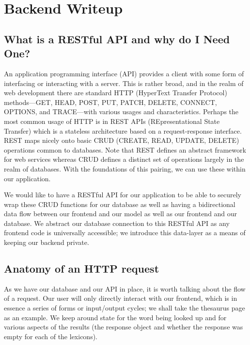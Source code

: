 \documentclass[11pt, twoside, reqno]{book}
\begin{document}
\chapter{Backend Writeup}

\section{What is a RESTful API and why do I Need One?}

An application programming interface (API) provides a client with some form of interfacing or interacting with a server. This is rather broad, and in the realm of web development there are standard HTTP (HyperText Transfer Protocol) methods—GET, HEAD, POST, PUT, PATCH, DELETE, CONNECT, OPTIONS, and TRACE—with various usages and characteristics. Perhaps the most common usage of HTTP is in REST APIs (REpresentational State Transfer) which is a stateless architecture based on a request-response interface. REST maps nicely onto basic CRUD (CREATE, READ, UPDATE, DELETE) operations common to databases. Note that REST defines an abstract framework for web services whereas CRUD defines a distinct set of operations largely in the realm of databases. With the foundations of this pairing, we can use these within our application.

We would like to have a RESTful API for our application to be able to securely wrap these CRUD functions for our database as well as having a bidirectional data flow between our frontend and our model as well as our frontend and our database. We abstract our database connection to this RESTful API as any frontend code is universally accessible; we introduce this data-layer as a means of keeping our backend private.

\section{Anatomy of an HTTP request}

As we have our database and our API in place, it is worth talking about the flow of a request. Our user will only directly interact with our frontend, which is in essence a series of forms or input/output cycles; we shall take the thesaurus page as an example. We keep around state for the word being looked up and for various aspects of the results (the response object and whether the response was empty for each of the lexicons).
\end{document}
